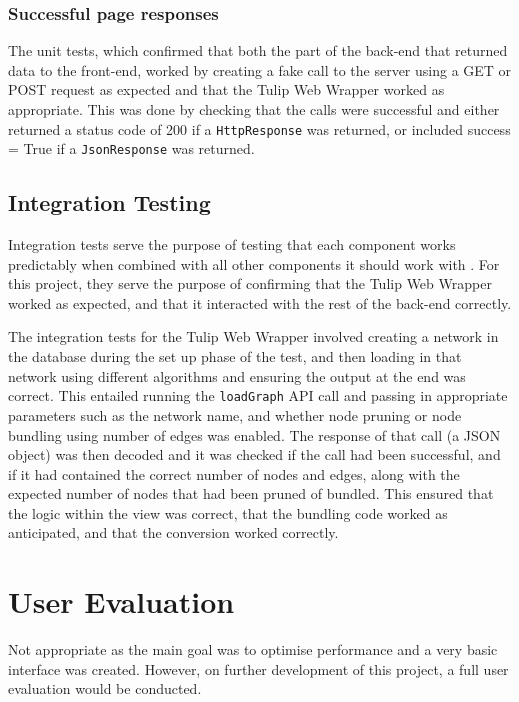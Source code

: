 \documentclass[../dissertation.tex]{subfiles}
\begin{document}
\subsubsection{Successful page responses}

The unit tests, which confirmed that both the part of the back-end that returned data to the front-end, worked by creating a fake call to the server using a GET or POST request as expected and that the Tulip Web Wrapper worked as appropriate. This was done by checking that the calls were successful and either returned a status code of 200 if a \texttt{HttpResponse} was returned, or included success = True if a \texttt{JsonResponse} was returned.

\subsection{Integration Testing}

Integration tests serve the purpose of testing that each component works predictably when combined with all other components it should work with \cite{basanieri2000practical}. For this project, they serve the purpose of confirming that the Tulip Web Wrapper worked as expected, and that it interacted with the rest of the back-end correctly.

The integration tests for the Tulip Web Wrapper involved creating a network in the database during the set up phase of the test, and then loading in that network using different algorithms and ensuring the output at the end was correct. This entailed running the \texttt{loadGraph} API call and passing in appropriate parameters such as the network name, and whether node pruning or node bundling using number of edges was enabled. The response of that call (a JSON object) was then decoded and it was checked if the call had been successful, and if it had contained the correct number of nodes and edges, along with the expected number of nodes that had been pruned of bundled. This ensured that the logic within the view was correct, that the bundling code worked as anticipated, and that the conversion worked correctly.

\section{User Evaluation}

Not appropriate as the main goal was to optimise performance and a very basic interface was created. However, on further development of this project, a full user evaluation would be conducted.
\end{document}
